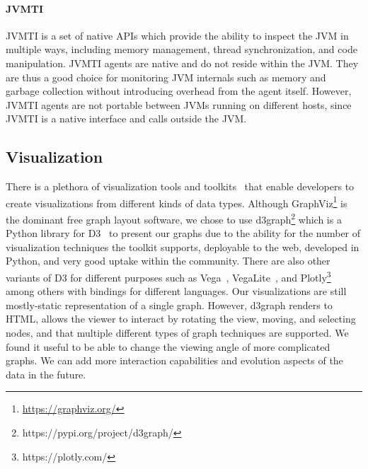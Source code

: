\paragraph{JVMTI}
JVMTI is a set of native APIs which provide the ability to inspect the JVM in multiple ways, including memory management, 
thread synchronization, and code manipulation.
JVMTI agents are native and do not reside within the JVM. 
They are thus a good choice for monitoring JVM internals such as memory and garbage collection without introducing overhead from the agent itself.
However, JVMTI agents are not portable between JVMs running on different hosts, since JVMTI is a native interface and calls outside the JVM.

\subsection{Visualization}
There is a plethora of visualization tools and toolkits~\cite{heer2010,liu2014} that enable developers to create visualizations from different kinds of data types. 
Although GraphViz\footnote{\url{https://graphviz.org/}} is the dominant
free graph layout software, we chose to use d3graph\footnote{https://pypi.org/project/d3graph/} which is a Python library for D3~\cite{bostock2011} to present our graphs due to the ability for the number of visualization techniques the toolkit supports, deployable to the web, developed in Python, and very good uptake within the community. There are also other variants of D3 for different purposes such as Vega~\cite{satyanarayan2016}, VegaLite~\cite{satyanarayan2017}, and Plotly\footnote{https://plotly.com/} among others with bindings for different languages. 
Our visualizations are still mostly-static representation of a single graph. However,
d3graph renders to HTML, allows the viewer to interact by rotating the view, moving, and selecting nodes, and that multiple different types of graph techniques are supported. We found it useful to be able to change the viewing angle of more complicated graphs. We can add more interaction capabilities and evolution aspects of the data in the future. 

